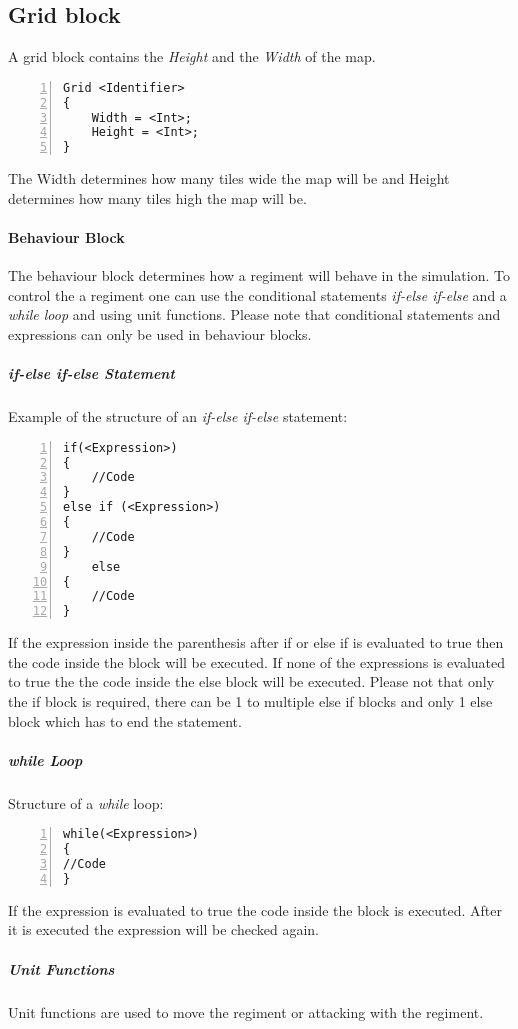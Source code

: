 	\subsection{Grid block}
		A grid block contains the {\it Height} and the {\it Width }of the map.

		\begin{lstlisting}[basicstyle=\small\sffamily,
		keywordstyle={\color{blue}},
		comment={[l]{//}}, morecomment={[s]{/*}{*/}}, commentstyle=\itshape,
		columns={[l]flexible}, numbers=left, numberstyle=\tiny,
		frameround=fftt, frame=shadowbox, captionpos=b,
		caption={Grid Block}]
Grid <Identifier>
{
	Width = <Int>;
	Height = <Int>;
}
		\end{lstlisting}	
		The Width determines how many tiles wide the map will be and Height determines how many tiles high the map will be.
	\paragraph{Behaviour Block}
		The behaviour block determines how a regiment will behave in the simulation. To control the a regiment one can 
		use the conditional statements {\it if-else if-else} and a {\it while loop} and using unit functions. Please note that 
		conditional statements and expressions can only be used in behaviour blocks.
		\subparagraph{if-else if-else Statement} Example of the structure of an {\it if-else if-else} statement:

		\begin{lstlisting}[basicstyle=\small\sffamily,
		keywordstyle={\color{blue}},
		comment={[l]{//}}, morecomment={[s]{/*}{*/}}, commentstyle=\itshape,
		columns={[l]flexible}, numbers=left, numberstyle=\tiny,
		frameround=fftt, frame=shadowbox, captionpos=b,
		caption={if and else if statements}]
if(<Expression>)
{
	//Code
}
else if (<Expression>)
{
	//Code
}
	else
{
	//Code
}
			\end{lstlisting}
			If the expression inside the parenthesis after if or else if is evaluated to true then the code inside the block will be executed.
			If none of the expressions is evaluated to true the the code inside the else block will be executed. Please not that only the if block
			is required, there can be 1 to multiple else if blocks and only 1 else block which has to end the statement. \\
		\subparagraph{while Loop}
			Structure of a {\it while} loop: \\			

		\begin{lstlisting}[basicstyle=\small\sffamily,
		keywordstyle={\color{blue}},
		comment={[l]{//}}, morecomment={[s]{/*}{*/}}, commentstyle=\itshape,
		columns={[l]flexible}, numbers=left, numberstyle=\tiny,
		frameround=fftt, frame=shadowbox, captionpos=b,
		caption={While loop}]
while(<Expression>)
{
//Code
}
			\end{lstlisting}
			If the expression is evaluated to true the code inside the block is executed. After it is executed the expression will be checked again.
		\subparagraph{Unit Functions}
			Unit functions are used to move the regiment or attacking with the regiment.

